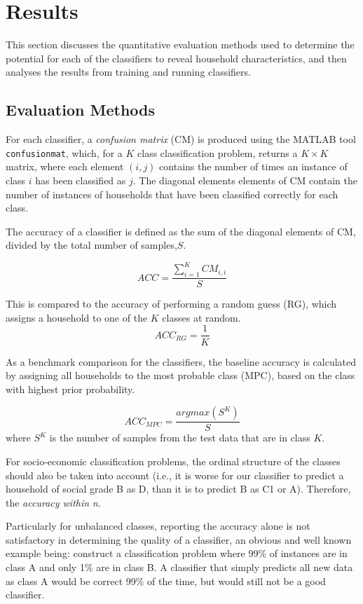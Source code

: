 \chapter{Results}
\label{ch:Results}
This section discusses the quantitative evaluation methods used to determine the potential for each of the classifiers to reveal household characteristics, and then analyses the results from training and running classifiers.

\section{Evaluation Methods}
\label{sec:evalMethods}
For each classifier, a \textit{confusion matrix} (CM) is produced using the MATLAB tool \texttt{confusionmat}, which, for a $K$ class classification problem, returns a $K\times K$ matrix, where each element $(i,j)$ contains the number of times an instance of class $i$ has been classified as $j$. The diagonal elements elements of CM contain the number of instances of households that have been classified correctly for each class. \cite{Stefanowski}


The accuracy of a classifier is defined as the sum of the diagonal elements of CM, divided by the total number of samples,$S$.

\[ACC=\frac{\sum_{i=1}^KCM_{i,i}}{S}\]

This is compared to the accuracy of performing a random guess (RG), which assigns a household to one of the $K$ classes at random.
\[ACC_{RG}=\frac{1}{K}\]

As a benchmark comparison for the classifiers, the baseline accuracy is calculated by assigning all households to the most probable class (MPC), based on the class with highest prior probability.   

\[ACC_{MPC}=\frac{argmax(S^K)}{S}\]
where $S^K$ is the number of samples from the test data that are in class $K$.

\bigskip

For socio-economic classification problems, the ordinal structure of the classes should also be taken into account (i.e., it is worse for our classifier to predict a household of social grade B as D, than it is to predict B as C1 or A). Therefore, the \textit{accuracy within n}\cite{Gaudette}. 

Particularly for unbalanced classes, reporting the accuracy alone is not satisfactory in determining the quality of a classifier, an obvious and well known example being: construct a classification problem where 99\% of instances are in class A and only 1\% are in class B. A classifier that simply predicts all new data as class A would be correct 99\% of the time, but would still not be a good classifier. 

